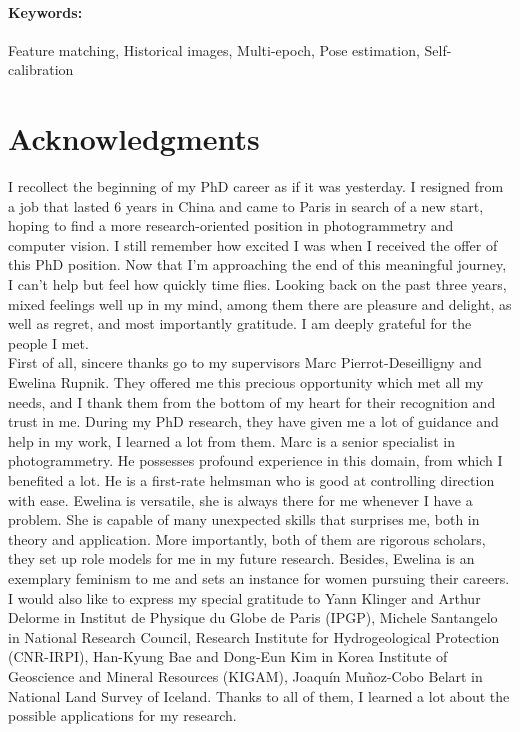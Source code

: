 \documentclass[a4paper,11pt,twoside]{ThesisStyle}
\begin{document}
\paragraph{Keywords:} Feature matching, Historical images, Multi-epoch, Pose estimation, Self-calibration

\cleardoublepage

\section*{Acknowledgments}
I recollect the beginning of my PhD career as if it was yesterday. 
I resigned from a job that lasted 6 years in China and came to Paris in search of a new start, hoping to find a more research-oriented position in photogrammetry and computer vision. 
I still remember how excited I was when I received the offer of this PhD position. 
Now that I'm approaching the end of this meaningful journey, I can't help but feel how quickly time flies. 
Looking back on the past three years, mixed feelings well up in my mind, among them there are pleasure and delight, as well as regret, and most importantly gratitude. I am deeply grateful for the people I met.\\

First of all, sincere thanks go to my supervisors Marc Pierrot-Deseilligny and Ewelina Rupnik. They offered me this precious opportunity which met all my needs, and I thank them from the bottom of my heart for their recognition and trust in me. During my PhD research, they have given me a lot of guidance and help in my work, I learned a lot from them. Marc is a senior specialist in photogrammetry. He possesses profound experience in this domain, from which I benefited a lot. He is a first-rate helmsman who is good at controlling direction with ease. Ewelina is versatile, she is always there for me whenever I have a problem. She is capable of many unexpected skills that surprises me, both in theory and application. 
More importantly, both of them are rigorous scholars, they set up role models for me in my future research.
Besides, Ewelina is an exemplary feminism to me and sets an instance for women pursuing their careers.\\

I would also like to express my special gratitude to Yann Klinger and Arthur Delorme in Institut de Physique du Globe de Paris (IPGP), Michele Santangelo in National Research Council, Research Institute for Hydrogeological Protection (CNR-IRPI), Han-Kyung Bae and Dong-Eun Kim in Korea Institute of Geoscience and Mineral Resources (KIGAM), Joaquín Muñoz-Cobo Belart in National Land Survey of Iceland. Thanks to all of them, I learned a lot about the possible applications for my research. \\
\end{document}

